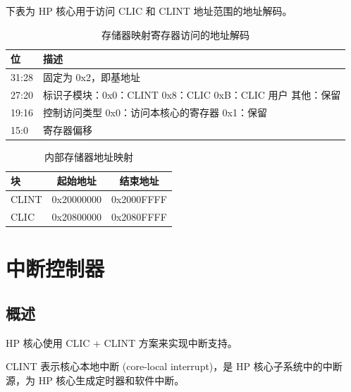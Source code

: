 \documentclass[main\_\_CN.tex]{subfiles}
\begin{document}
下表为 HP 核心用于访问 CLIC 和 CLINT 地址范围的地址解码。

\begin{longtable}{ | l | p{5 cm} | }
\caption{存储器映射寄存器访问的地址解码} \label{tab:riscvcpu-tcip-table}
\\ \hline
\rowcolor{lightgray}
位 & 描述 \\ \hline
31:28 & 固定为 0x2，即基地址 \\ \hline
27:20 & 标识子模块：\newline 0x0：CLINT \newline 0x8：CLIC \newline 0xB：CLIC 用户 \newline 其他：保留 \\ \hline
19:16 & 控制访问类型 \newline 0x0：访问本核心的寄存器 \newline 0x1：保留\\ \hline
15:0 & 寄存器偏移 \\ \hline
\end{longtable}


\begin{longtable}{ | l | c | c |}
\caption{内部存储器地址映射} \label{tab:riscvcpu-tcip-slave-table}
\\ \hline
\rowcolor{lightgray}
块 & 起始地址 & 结束地址 \\ \hline
CLINT & 0x20000000  &  0x2000FFFF\\ \hline
CLIC & 0x20800000  &  0x2080FFFF\\ \hline

\end{longtable}

\newpage
\section{中断控制器}
\label{sec:riscvcpu-int-ctrl}


\subsection{概述}
\label{sec:riscvcpu-intr-overview}

HP 核心使用 CLIC + CLINT 方案来实现中断支持。

CLINT 表示核心本地中断 (core-local interrupt)，是 HP 核心子系统中的中断源，为 HP 核心生成定时器和软件中断。
\end{document}
